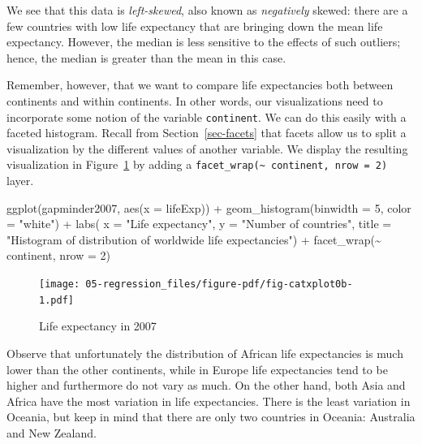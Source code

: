 \documentclass[
  letterpaper,
  DIV=11,
  numbers=noendperiod]{scrreprt}
\newenvironment{Shaded}{\begin{snugshade}}{\end{snugshade}}
\newcommand{\AttributeTok}[1]{\textcolor[rgb]{0.40,0.45,0.13}{#1}}
\newcommand{\DecValTok}[1]{\textcolor[rgb]{0.68,0.00,0.00}{#1}}
\newcommand{\FunctionTok}[1]{\textcolor[rgb]{0.28,0.35,0.67}{#1}}
\newcommand{\NormalTok}[1]{\textcolor[rgb]{0.00,0.23,0.31}{#1}}
\newcommand{\SpecialCharTok}[1]{\textcolor[rgb]{0.37,0.37,0.37}{#1}}
\newcommand{\StringTok}[1]{\textcolor[rgb]{0.13,0.47,0.30}{#1}}
\theoremstyle{definition}
\theoremstyle{remark}
\begin{document}
We see that this data is \emph{left-skewed}, also known as
\emph{negatively} skewed: there are a few countries with low life
expectancy that are bringing down the mean life expectancy. However, the
median is less sensitive to the effects of such outliers; hence, the
median is greater than the mean in this case.

Remember, however, that we want to compare life expectancies both
between continents and within continents. In other words, our
visualizations need to incorporate some notion of the variable
\texttt{continent}. We can do this easily with a faceted histogram.
Recall from Section~\ref{sec-facets} that facets allow us to split a
visualization by the different values of another variable. We display
the resulting visualization in Figure~\ref{fig-catxplot0b} by adding a
\texttt{facet\_wrap(\textasciitilde{}\ continent,\ nrow\ =\ 2)} layer.

\begin{Shaded}
\begin{Highlighting}[]
\FunctionTok{ggplot}\NormalTok{(gapminder2007, }\FunctionTok{aes}\NormalTok{(}\AttributeTok{x =}\NormalTok{ lifeExp)) }\SpecialCharTok{+}
  \FunctionTok{geom\_histogram}\NormalTok{(}\AttributeTok{binwidth =} \DecValTok{5}\NormalTok{, }\AttributeTok{color =} \StringTok{"white"}\NormalTok{) }\SpecialCharTok{+}
  \FunctionTok{labs}\NormalTok{(}
    \AttributeTok{x =} \StringTok{"Life expectancy"}\NormalTok{,}
    \AttributeTok{y =} \StringTok{"Number of countries"}\NormalTok{,}
    \AttributeTok{title =} \StringTok{"Histogram of distribution of worldwide life expectancies"}\NormalTok{) }\SpecialCharTok{+}
  \FunctionTok{facet\_wrap}\NormalTok{(}\SpecialCharTok{\textasciitilde{}}\NormalTok{ continent, }\AttributeTok{nrow =} \DecValTok{2}\NormalTok{)}
\end{Highlighting}
\end{Shaded}

\begin{figure}

{\centering \texttt{[image: 05-regression\_files/figure-pdf/fig-catxplot0b-1.pdf]}

}

\caption{\label{fig-catxplot0b}Life expectancy in 2007}

\end{figure}

Observe that unfortunately the distribution of African life expectancies
is much lower than the other continents, while in Europe life
expectancies tend to be higher and furthermore do not vary as much. On
the other hand, both Asia and Africa have the most variation in life
expectancies. There is the least variation in Oceania, but keep in mind
that there are only two countries in Oceania: Australia and New Zealand.
\end{document}
